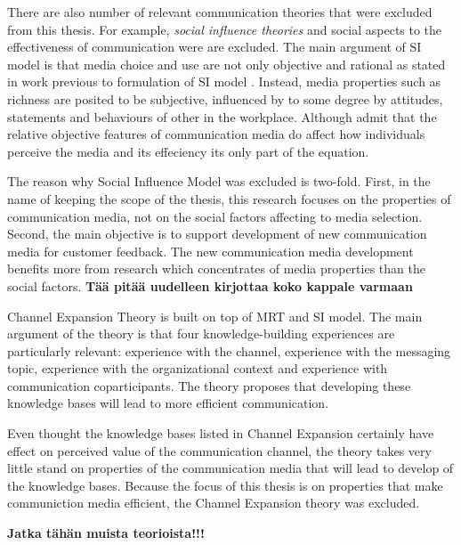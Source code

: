 \documentclass[english,12pt,a4paper,pdftex]{article}
\begin{document}
There are also number of relevant communication theories that were excluded from this thesis. For example, \emph{social influence theories} and social aspects to the effectiveness of communication were are excluded. The main argument of \ac{SI} model is that media choice and use are not only objective and rational as stated in work previous to formulation of \ac{SI} model \citep{fulk1987}. Instead, media properties such as richness are posited to be subjective, influenced by to some degree by attitudes, statements and behaviours of other in the workplace. Although \citet{schmitz1991} admit that the relative objective features of communication media do affect how individuals perceive the media and its effeciency its only part of the equation.

The reason why Social Influence Model was excluded is two-fold. First, in the name of keeping the scope of the thesis, this research focuses on the properties of communication media, not on the social factors affecting to media selection. Second, the main objective is to support development of new communication media for customer feedback. The new communication media development benefits more from research which concentrates of media properties than the social factors. \textbf{Tää pitää uudelleen kirjottaa koko kappale varmaan}

Channel Expansion Theory is built on top of \ac{MRT} and \ac{SI} model. The main argument of the theory is that four knowledge-building experiences are particularly relevant: experience with the channel, experience with the messaging topic, experience with the organizational context and experience with communication coparticipants. The theory proposes that developing these knowledge bases will lead to more efficient communication. \citep{carlson1994} \citep{carlson1999}

Even thought the knowledge bases listed in Channel Expansion certainly have effect on perceived value of the communication channel, the theory takes very little stand on properties of the communication media that will lead to develop of the knowledge bases. Because the focus of this thesis is on properties that make communiction media efficient, the Channel Expansion theory was excluded.

\textbf{Jatka tähän muista teorioista!!!}

\end{document}
